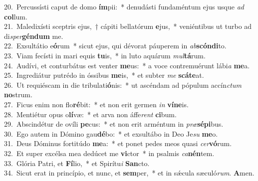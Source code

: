 {20.~}Percussísti caput de domo \textbf{ím}pii:~* denudásti fundaméntum ejus usque \textit{ad} \textbf{col}lum.\\
{21.~}Maledixísti sceptris ejus,~† cápiti bellatórum \textbf{e}jus,~* veniéntibus ut turbo ad di\textit{sper}\textbf{gén}\textbf{dum} me.\\
{22.~}Exsultátio e\textbf{ó}rum~* sicut ejus, qui dévorat páuperem in \textit{ab}\textbf{scón}\textbf{di}to.\\
{23.~}Viam fecísti in mari equis \textbf{tu}is,~* in luto aquárum \textit{mul}\textbf{tá}rum.\\
{24.~}Audívi, et conturbátus est venter \textbf{me}us:~* a voce contremuérunt lábi\textit{a} \textbf{me}a.\\
{25.~}Ingrediátur putrédo in óssibus \textbf{me}is,~* et subter \textit{me} \textbf{scá}\textbf{te}at.\\
{26.~}Ut requiéscam in die tribulati\textbf{ó}nis:~* ut ascéndam ad pópulum accín\textit{ctum} \textbf{no}strum.\\
{27.~}Ficus enim non flo\textbf{ré}bit:~* et non erit germen \textit{in} \textbf{ví}\textbf{ne}is.\\
{28.~}Mentiétur opus o\textbf{lí}væ:~* et arva non áffe\textit{rent} \textbf{ci}bum.\\
{29.~}Abscindétur de ovíli \textbf{pe}cus:~* et non erit arméntum in \textit{præ}\textbf{sé}\textbf{pi}bus.\\
{30.~}Ego autem in Dómino gau\textbf{dé}bo:~* et exsultábo in Deo Je\textit{su} \textbf{me}o.\\
{31.~}Deus Dóminus fortitúdo \textbf{me}a:~* et ponet pedes meos quasi \textit{cer}\textbf{vó}rum.\\
{32.~}Et super excélsa mea dedúcet me \textbf{vi}ctor~* in psalmis \textit{ca}\textbf{nén}tem.\\
{33.~}Glória Patri, et \textbf{Fí}lio,~* et Spirítu\textit{i} \textbf{San}cto.\\
{34.~}Sicut erat in princípio, et nunc, et \textbf{sem}per,~* et in sǽcula sæculó\textit{rum}. \textbf{A}men.\\
